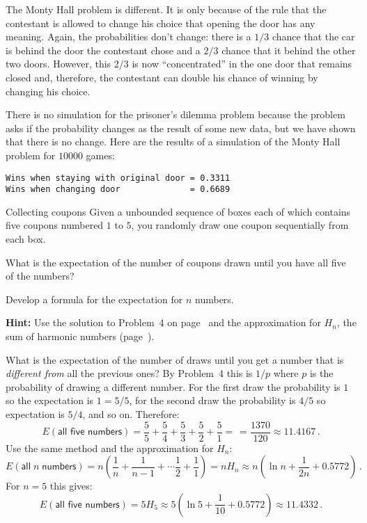 The Monty Hall problem is different. It is only because of the rule that the contestant is allowed to change his choice that opening the door has any meaning. Again, the probabilities don't change: there is a $1/3$ chance that the car is behind the door the contestant chose and a $2/3$ chance that it behind the other two doors. However, this $2/3$ is now ``concentrated'' in the one door that remains closed and, therefore, the contestant can double his chance of winning by changing his choice.

\sml{}


There is no simulation for the prisoner's dilemma problem because the problem asks if the probability changes as the result of some new data, but we have shown that there is no change. Here are the results of a simulation of the Monty Hall problem for $10000$ games:

\begin{verbatim}
Wins when staying with original door = 0.3311
Wins when changing door              = 0.6689
\end{verbatim}


\begin{prob}{Collecting coupons}
Given a unbounded sequence of boxes each of which contains five coupons numbered $1$ to $5$, you randomly draw one coupon sequentially from each box.

 What is the expectation of the number of coupons drawn until you have all five of the numbers?

 Develop a formula for the expectation for $n$ numbers.

\textbf{Hint:} Use the solution to Problem~4 on page~\pageref{p.four} and the approximation for $H_n$, the sum of harmonic numbers (page~\pageref{p.harmonic}).
\end{prob}

\solution{}

 What is the expectation of the number of draws until you get a  number that is \emph{different from} all the previous ones? By  Problem~4 this is $1/p$ where $p$ is the probability of drawing a different number. For the first draw the probability is $1$ so the expectation is $1=5/5$, for the second draw the probability is $4/5$ so expectation is $5/4$, and so on. Therefore:
\[
E(\textsf{all five numbers}) = \frac{5}{5}+\frac{5}{4} + \frac{5}{3} + \frac{5}{2} + \frac{5}{1} = \frac{}{} =\frac{1370}{120}\approx 11.4167\,.
\]
 Use the same method and the approximation for $H_n$:
\[
E(\textsf{all}\;n \;\textsf{numbers}) = n\left(\frac{1}{n}+\frac{1}{n-1} + \cdots \frac{1}{2} + \frac{1}{1}\right) =nH_n\approx n\left(\ln n + \frac{1}{2n} + 0.5772\right)\,. 
\]
For $n=5$ this gives:
\[
E(\textsf{all five numbers}) =5H_5\approx 5\left(\ln 5 + \frac{1}{10} + 0.5772\right) \approx 11.4332\,.
\]

